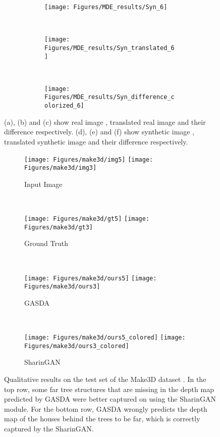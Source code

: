 \documentclass[10pt,twocolumn,letterpaper]{article}
\begin{document}
\begin{figure*}
\begin{subfigure}{0.49\linewidth}
    \begin{subfigure}{0.33\linewidth}{
\texttt{[image: Figures/MDE\_results/Syn\_6]}}
        \caption{}
    \end{subfigure}~
    \begin{subfigure}{0.33\linewidth}{
\texttt{[image: Figures/MDE\_results/Syn\_translated\_6]}}
        \caption{}
    \end{subfigure}~
    \begin{subfigure}{0.33\linewidth}{
\texttt{[image: Figures/MDE\_results/Syn\_difference\_colorized\_6]}}
        \caption{}
    \end{subfigure}\end{subfigure}\caption{(a), (b) and (c) show real image , translated real image  and their difference  respectively. (d), (e) and (f) show synthetic image , translated synthetic image  and their difference  respectively.}
\label{fig:MDE_SharinGAN}
\end{figure*}

\begin{figure*}[!t]
    \begin{subfigure}{0.25\linewidth}{
        \texttt{[image: Figures/make3d/img5]}
        \texttt{[image: Figures/make3d/img3]}}
        \caption{Input Image}
    \end{subfigure}~
    \begin{subfigure}{0.25\linewidth}{
        \texttt{[image: Figures/make3d/gt5]}
        \texttt{[image: Figures/make3d/gt3]}}
        \caption{Ground Truth}
    \end{subfigure}~
    \begin{subfigure}{0.25\linewidth}{
        \texttt{[image: Figures/make3d/ours5]}
        \texttt{[image: Figures/make3d/ours3]}}
        \caption{GASDA\cite{GASDA}}
    \end{subfigure}~
    \begin{subfigure}{0.25\linewidth}{
        \texttt{[image: Figures/make3d/ours5\_colored]}
        \texttt{[image: Figures/make3d/ours3\_colored]}}
        \caption{SharinGAN}
    \end{subfigure}\caption{Qualitative results on the test set of the Make3D dataset \cite{make3D}. In the top row, some far tree structures that are missing in the depth map predicted by GASDA were better captured on using the SharinGAN module. For the bottom row, GASDA wrongly predicts the depth map of the houses behind the trees to be far, which is correctly captured by the SharinGAN.}
\label{fig:MDE_SharinGAN_make3d}
\end{figure*}
\end{document}
